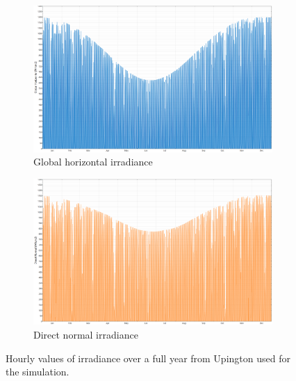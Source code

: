 \begin{figure}[!htbp]
        \centering
                \begin{subfigure}[b]{1\textwidth}
                \centering
                \includegraphics[width=1\textwidth]{FIG/Upington_GHI}
                \caption{Global horizontal irradiance}\label{Upington_GHI}
        \end{subfigure}
\par\medskip %
        \begin{subfigure}[b]{1\textwidth}
                \centering
                \includegraphics[width=1\textwidth]{FIG/Upington_DNI}
                \caption{Direct normal irradiance}\label{Upington_DNI}
        \end{subfigure}

        \caption[Hourly values of irradiance over a full year from Upington used for the simulation.]{Hourly values of irradiance over a full year from Upington used for the simulation.}\label{Upington_GHI/DNI}
\end{figure}
